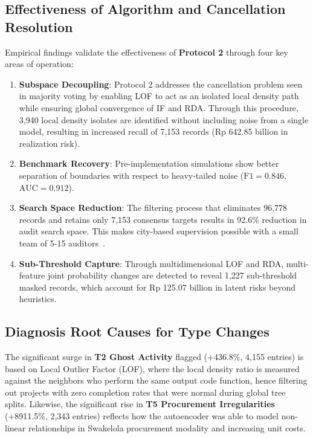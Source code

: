 \documentclass[conference]{IEEEtran}
\begin{document}
\subsection{Effectiveness of Algorithm and Cancellation Resolution}

Empirical findings validate the effectiveness of \textbf{Protocol 2} through four key areas of operation:
\begin{enumerate}
    \item \textbf{Subspace Decoupling}: Protocol 2 addresses the cancellation problem seen in majority voting by enabling LOF to act as an isolated local density path while ensuring global convergence of IF and RDA. Through this procedure, 3,940 local density isolates are identified without including noise from a single model, resulting in increased recall of 7,153 records (Rp 642.85 billion in realization risk).
    \item \textbf{Benchmark Recovery}: Pre-implementation simulations show better separation of boundaries with respect to heavy-tailed noise ($\text{F1} = 0.846$, $\text{AUC} = 0.912$).
    \item \textbf{Search Space Reduction}:  The filtering process that eliminates 96,778 records and retains only 7,153 consensus targets results in 92.6\% reduction in audit search space. This makes city-based supervision possible with a small team of 5-15 auditors~\cite{ref12}.
    \item \textbf{Sub-Threshold Capture}: Through multidimensional LOF and RDA, multi-feature joint probability changes are detected to reveal 1,227 sub-threshold masked records, which account for Rp 125.07 billion in latent risks beyond heuristics.
\end{enumerate}

\subsection{Diagnosis Root Causes for Type Changes}

The significant surge in \textbf{T2 Ghost Activity} flagged (+436.8\%, 4,155 entries) is based on Local Outlier Factor (LOF), where the local density ratio is measured against the neighbors who perform the same output code function, hence filtering out projects with zero completion rates that were normal during global tree splits. Likewise, the significant rise in \textbf{T5 Procurement Irregularities} (+8911.5\%, 2,343 entries) reflects how the autoencoder was able to model non-linear relationships in Swakelola procurement modality and increasing unit costs.
\end{document}
